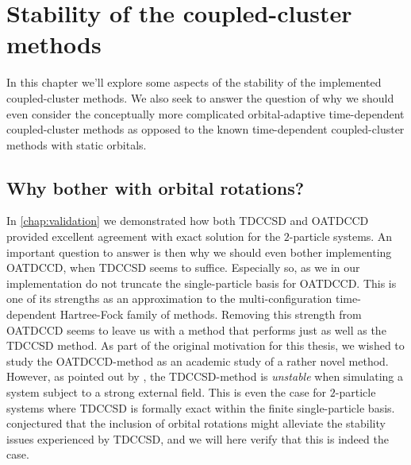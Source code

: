\chapter{Stability of the coupled-cluster methods}
    \label{chap:stability}
    In this chapter we'll explore some aspects of the stability of the
    implemented coupled-cluster methods.
    We also seek to answer the question of why we should even consider the
    conceptually more complicated orbital-adaptive time-dependent
    coupled-cluster methods as opposed to the known time-dependent
    coupled-cluster methods with static orbitals.

    \section{Why bother with orbital rotations?}
        In \autoref{chap:validation} we demonstrated how both TDCCSD and OATDCCD
        provided excellent agreement with exact solution for the $2$-particle
        systems.
        An important question to answer is then why we should even bother
        implementing OATDCCD, when TDCCSD seems to suffice.
        Especially so, as we in our implementation do not truncate the
        single-particle basis for OATDCCD.
        This is one of its strengths as an approximation to the
        multi-configuration time-dependent Hartree-Fock family of methods.
        Removing this strength from OATDCCD seems to leave us with a method that
        performs just as well as the TDCCSD method.
        As part of the original motivation for this thesis, we wished to study
        the OATDCCD-method as an academic study of a rather novel method.
        However, as pointed out by \citeauthor{pedersen2018symplectic}
        \cite{pedersen2018symplectic}, the TDCCSD-method is \emph{unstable} when
        simulating a system subject to a strong external field.
        This is even the case for $2$-particle systems where TDCCSD is formally
        exact within the finite single-particle basis.
        \citeauthor{pedersen2018symplectic} conjectured that the inclusion of
        orbital rotations might alleviate the stability issues experienced by
        TDCCSD, and we will here verify that this is indeed the case.

